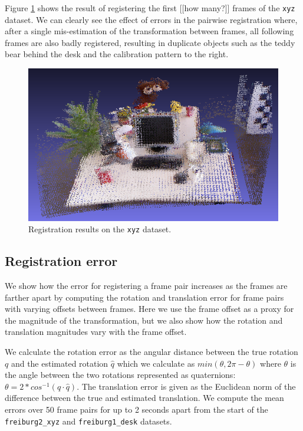 \documentclass[a4paper]{article}
\begin{document}
Figure \ref{fig:xyz_results} shows the result of registering the first [[how many?]] frames of the \texttt{xyz} dataset. We can clearly see the effect of errors in the pairwise registration where, after a single mis-estimation of the transformation between frames, all following frames are also badly registered, resulting in duplicate objects such as the teddy bear behind the desk and the calibration pattern to the right.

\begin{figure}[htbp]
    \centering
        \includegraphics[width=\textwidth]{ims/xyz_results.png}
    \caption{Registration results on the \texttt{xyz} dataset.}
    \label{fig:xyz_results}
\end{figure}


\subsection{Registration error}
\label{registration_error}

We show how the error for registering a frame pair increases as the frames are farther apart by computing the rotation and translation error for frame pairs with varying offsets between frames. Here we use the frame offset as a proxy for the magnitude of the transformation, but we also show how the rotation and translation magnitudes vary with the frame offset.

We calculate the rotation error as the angular distance between the true rotation $q$ and the estimated rotation $\hat q$ which we calculate as $min(\theta, 2\pi - \theta)$ where $\theta$ is the angle between the two rotations represented as quaternions: $\theta = 2 * cos^{-1}(q \cdot \hat q)$. %
The translation error is given as the Euclidean norm of the difference between the true and estimated translation. We compute the mean errors over 50 frame pairs for up to 2 seconds apart from the start of the \texttt{freiburg2\_xyz} and \texttt{freiburg1\_desk} datasets.
\end{document}
